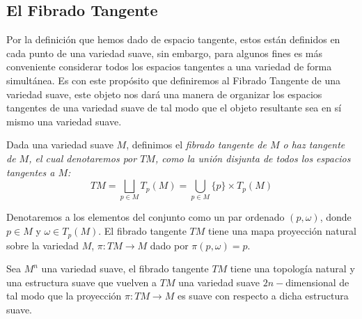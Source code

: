 \subsection{El Fibrado Tangente}\label{Subsección: Fibrado Tangente}
Por la definición que hemos dado de espacio tangente, estos están definidos en cada punto de una variedad suave, sin embargo, para algunos fines es más conveniente considerar todos los espacios tangentes a una variedad de forma simultánea. Es con este propósito que definiremos al Fibrado Tangente de una variedad suave, este objeto nos dará una manera de organizar los espacios tangentes de una variedad suave de tal modo que el objeto resultante sea en sí mismo una variedad suave.

\begin{definition}
	Dada una variedad suave $M$, definimos el \it{fibrado tangente de $M$} o \it{haz tangente de $M$}, el cual denotaremos por $TM$, como la unión disjunta de todos los espacios tangentes a $M$:
	\[ TM = \bigsqcup_{p \in M} T_p(M) = \bigcup_{p \in M} \{p\} \times T_p(M) \]
\end{definition}

Denotaremos a los elementos del conjunto como un par ordenado $(p, \omega)$, donde $p \in M$ y $\omega \in T_p(M)$. El fibrado tangente $TM$ tiene una mapa proyección natural sobre la variedad $M$, $\pi: TM \to M$ dado por $\pi(p,\omega)=p$.

\begin{theorem}
	Sea $M^n$ una variedad suave, el fibrado tangente $TM$ tiene una topología natural y una estructura suave que vuelven a $TM$ una variedad suave $2n-$dimensional de tal modo que la proyección $\pi: TM \to M$ es suave con respecto a dicha estructura suave.
\end{theorem}


